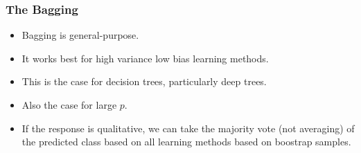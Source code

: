 \documentclass{beamer}
\begin{document}
                   \begin{frame}
                   	\frametitle{The     Bagging  }
                   	\begin{itemize}
                   		\item Bagging is general-purpose.
                   	 
                   
                   		\item  It works best for high variance low bias learning methods.
                   		\item  This is the case for decision trees, particularly deep trees.
                   		\item  Also the case for large $p$. 
                   		
                   		\item  If the response is qualitative, we can take the majority vote (not averaging) of the 
                   		predicted class based on all learning methods based on boostrap samples. 
                       		
                   		
                   	\end{itemize}
                   \end{frame} 
               
             
         
\end{document}
